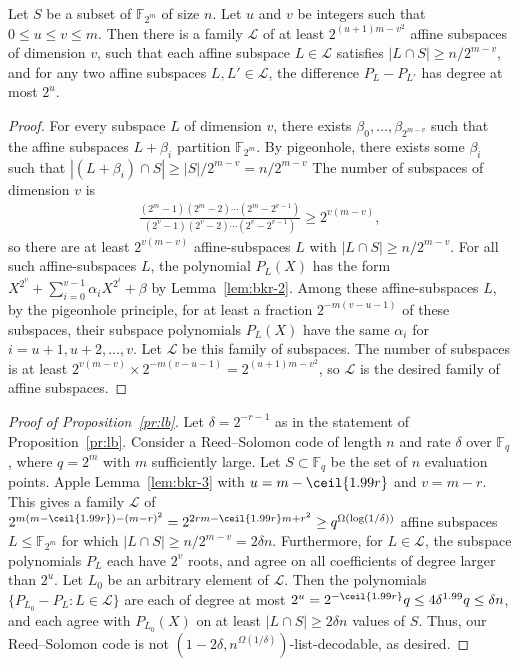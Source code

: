 \documentclass{article}[11pt]
\begin{document}
\begin{lemma}
  Let $S$ be a subset of $\mathbb{F}_{2^m}$ of size $n$.
  Let $u$ and $v$ be integers such that $0\le u\le v\le m$.
  Then there is a family $\mathcal{L}$ of at least $2^{(u+1)m-v^2}$ affine subspaces of dimension $v$, such that each affine subspace $L\in\mathcal{L}$ satisfies $|L\cap S|\ge n/2^{m-v}$, and for any two affine subspaces $L,L'\in\mathcal{L}$, the difference $P_{L}-P_{L'}$ has degree at most $2^u$.
 \label{lem:bkr-3}
\end{lemma}
\begin{proof}
  For every subspace $L$ of dimension $v$, there exists $\beta_0,\dots,\beta_{2^{m-v}}$ such that the affine subspaces $L+\beta_i$ partition $\mathbb{F}_{2^m}$.
  By pigeonhole, there exists some $\beta_i$ such that $|(L+\beta_i)\cap S| \ge |S|/2^{m-v} = n/2^{m-v}$
  The number of subspaces of dimension $v$ is
  \begin{align}
    \frac{(2^m-1)(2^m-2)\cdots(2^m-2^{v-1})}{(2^v-1)(2^v-2)\cdots(2^v-2^{v-1})} \ge 2^{v(m-v)},
    \label{}
  \end{align}
  so there are at least $2^{v(m-v)}$ affine-subspaces $L$ with $|L\cap S|\ge n/2^{m-v}$.
  For all such affine-subspaces $L$, the polynomial $P_L(X)$ has the form $X^{2^v} + \sum_{i=0}^{v-1} \alpha_iX^{2^i}+\beta$ by Lemma~\ref{lem:bkr-2}.
  Among these affine-subspaces $L$, by the pigeonhole principle, for at least a fraction $2^{-m(v-u-1)}$ of these subspaces, their subspace polynomials $P_L(X)$ have the same $\alpha_i$ for $i=u+1,u+2,\dots,v$.
  Let $\mathcal{L}$ be this family of subspaces.
  The number of subspaces is at least $2^{v(m-v)}\times 2^{-m(v-u-1)}=2^{(u+1)m-v^2}$, so $\mathcal{L}$ is the desired family of affine subspaces.
\end{proof}

\begin{proof}[Proof of Proposition~\ref{pr:lb}]
  Let $\delta=2^{-r-1}$ as in the statement of Proposition~\ref{pr:lb}.
  Consider a Reed--Solomon code of length $n$ and rate $\delta$ over $\mathbb{F}_q$, where $q=2^m$ with $m$ sufficiently large.
  Let $S\subset\mathbb{F}_q$ be the set of $n$ evaluation points.
  Apple Lemma~\ref{lem:bkr-3} with $u=m-\ceil{1.99r}$ and $v=m-r$.
  This gives a family $\mathcal{L}$ of $2^{m(m-\ceil{1.99r}) - (m-r)^2} = 2^{2rm-\ceil{1.99r}m +r^2}\ge q^{\Omega(\log(1/\delta))}$ affine subspaces $L\le \mathbb{F}_{2^m}$ for which $|L\cap S|\ge n/2^{m-v} = 2\delta n$.
  Furthermore, for $L\in \mathcal{L}$, the subspace polynomials $P_L$ each have $2^v$ roots, and agree on all coefficients of degree larger than $2^u$. 
  Let $L_0$ be an arbitrary element of $\mathcal{L}$.
  Then the polynomials $\{P_{L_0}-P_{L}:L\in \mathcal{L}\}$ are each of degree at most $2^u = 2^{-\ceil{1.99r}}q\le 4\delta^{1.99}q\le\delta n$, and each agree with $P_{L_0}(X)$ on at least $|L\cap S|\ge 2\delta n$ values of $S$.
  Thus, our Reed--Solomon code is not $(1-2\delta, n^{\Omega(1/\delta)})$-list-decodable, as desired.
\end{proof}
\end{document}
